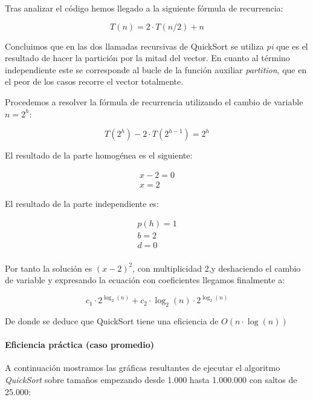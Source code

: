 \documentclass[a4paper,12pt]{article} %
\begin{document}
Tras analizar el código hemos llegado a la siguiente fórmula de recurrencia:

\begin{equation*}
	T(n) = 2\cdot T(n/2) + n
\end{equation*}

Concluimos que en las dos llamadas recursivas de QuickSort
se utiliza \textit{pi} que es el resultado de hacer la partición por la mitad del vector. En cuanto
al término independiente este se corresponde al bucle de la función auxiliar \textit{partition}, que en
el peor de los casos recorre el vector totalmente.

Procedemos a resolver la fórmula de recurrencia utilizando el cambio de variable $n=2^h$:

\begin{equation*}
	T(2^{h}) - 2\cdot T(2^{h-1}) = 2^{h}
\end{equation*}

El resultado de la parte homogénea es el siguiente:

\begin{align*}
	x - 2 = 0 \\
	x = 2
\end{align*}

El resultado de la parte independiente es:

\begin{align*}
	p(h) = 1 \\
	b = 2    \\
	d = 0    \\
\end{align*}

Por tanto la solución es $(x-2)^2$, con multiplicidad 2,y deshaciendo el
cambio de variable y expresando la ecuación con coeficientes llegamos finalmente
a:

\begin{equation*}
	c_{1}\cdot 2^{\log _{2}(n)} + c_{2}\cdot \log_{2}(n)\cdot 2^{\log_{2}(n)}
\end{equation*}

De donde se deduce que QuickSort tiene una eficiencia de $O(n\cdot \log(n))$
\\ 
\paragraph{Eficiencia práctica (caso promedio)}

A continuación mostramos las gráficas resultantes de ejecutar el algoritmo \textit{QuickSort} 
sobre tamaños empezando desde 1.000 hasta 1.000.000 con saltos de 25.000:
\end{document}

